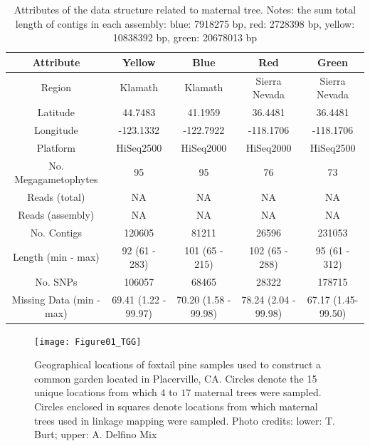 \documentclass[11pt]{article}
\begin{document}
\clearpage

\singlespacing



\clearpage
\begin{landscape}

\begin{table}[ht]
\centering
\begin{tabular}{ccccc}
\toprule
Attribute & Yellow & Blue & Red & Green\\
\midrule
Region & Klamath & Klamath & Sierra Nevada & Sierra Nevada \\
Latitude & 44.7483 & 41.1959 & 36.4481 & 36.4481 \\
Longitude & -123.1332 & -122.7922 & -118.1706 & -118.1706 \\
Platform & HiSeq2500 & HiSeq2000 & HiSeq2000 & HiSeq2500 \\
No. Megagametophytes & 95 & 95 & 76 & 73 \\
Reads (total) & NA & NA & NA & NA \\
Reads (assembly) & NA & NA & NA & NA \\
No. Contigs & 120605 & 81211 & 26596 & 231053 \\
Length (min - max) & 92 (61 - 283) & 101 (65 - 215) & 102 (65 - 288)  & 95 (61 - 312) \\
No. SNPs & 106057 & 68465 & 28322 & 178715 \\
Missing Data (min - max) & 69.41 (1.22 - 99.97) & 70.20 (1.58 - 99.98) & 78.24 (2.04 - 99.98) & 67.17 (1.45-99.50) \\
\bottomrule
\end{tabular}
\caption{Attributes of the data structure related to maternal tree. Notes: the sum total length of
contigs in each assembly: blue: 7918275 bp, red: 2728398 bp, yellow: 10838392 bp, green: 20678013 bp} 
\label{t:label}
\end{table}
\end{landscape}

\clearpage

\begin{figure}[ht]
\centering
\texttt{[image: Figure01\_TGG]}
\caption{Geographical locations of foxtail pine samples used to construct a common garden located in Placerville, CA. Circles 
denote the 15 unique locations from which $4$ to $17$ maternal trees were sampled. Circles enclosed in squares denote 
locations from which maternal trees used in linkage mapping were sampled. Photo credits: lower: T. Burt; upper: A. Delfino Mix}
\label{f:Figure01_TGG}
\end{figure}
\end{document}
